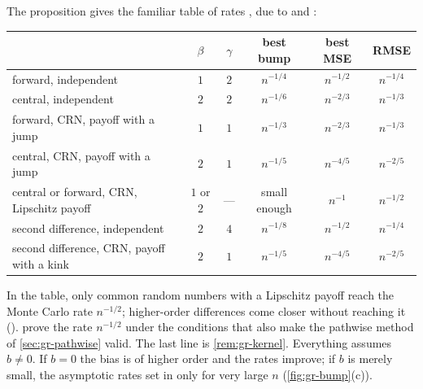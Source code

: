 The proposition gives the familiar table of rates
\citep[Sections~7.1.1--7.1.2]{glasserman-mc}, due to \textcite{glynn-1989} and
\textcite{lecuyer-perron}:
\begin{center}
\small
\begin{tabular}{@{}lccccc@{}}
  \toprule
  & $\beta$ & $\gamma$ & best bump & best MSE & RMSE \\
  \midrule
  forward, independent & $1$ & $2$ & $n^{-1/4}$ & $n^{-1/2}$ & $n^{-1/4}$ \\
  central, independent & $2$ & $2$ & $n^{-1/6}$ & $n^{-2/3}$ & $n^{-1/3}$ \\
  forward, CRN, payoff with a jump & $1$ & $1$ & $n^{-1/3}$ & $n^{-2/3}$ & $n^{-1/3}$ \\
  central, CRN, payoff with a jump & $2$ & $1$ & $n^{-1/5}$ & $n^{-4/5}$ & $n^{-2/5}$ \\
  central or forward, CRN, Lipschitz payoff & $1$ or $2$ & --- & small enough & $n^{-1}$ & $n^{-1/2}$ \\
  \midrule
  second difference, independent & $2$ & $4$ & $n^{-1/8}$ & $n^{-1/2}$ & $n^{-1/4}$ \\
  second difference, CRN, payoff with a kink & $2$ & $1$ & $n^{-1/5}$ & $n^{-4/5}$ & $n^{-2/5}$ \\
  \bottomrule
\end{tabular}
\end{center}
In the table, only common random numbers with a Lipschitz payoff reach the Monte Carlo rate
$n^{-1/2}$; higher-order differences come closer without reaching it ().
\textcite{lecuyer-perron} prove the rate $n^{-1/2}$ under the conditions that also make the
pathwise method of \cref{sec:gr-pathwise} valid. The last line is
\cref{rem:gr-kernel}. Everything assumes $b\ne0$. If $b=0$ the bias is of higher order and
the rates improve; if $b$ is merely small, the asymptotic rates set in only for very large $n$
(\cref{fig:gr-bump}(c)).

